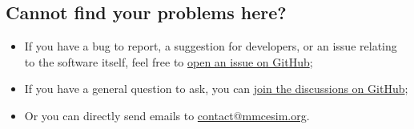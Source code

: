 \subsection*{Cannot find your problems here?}
\begin{itemize}
  \item If you have a bug to report, a suggestion for developers, or an issue relating to the software itself, feel free to \href{https://github.com/mmcesim/mmcesim/issues}{open an issue on GitHub};
  \item If you have a general question to ask, you can \href{https://github.com/orgs/mmcesim/discussions}{join the discussions on GitHub};
  \item Or you can directly send emails to \href{mailto:contact@mmcesim.org}{contact@mmcesim.org}.
\end{itemize}
